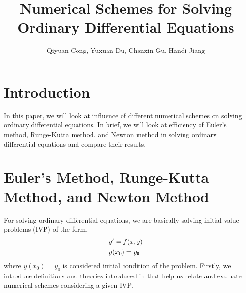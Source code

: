 \documentclass[
11pt, %
a4paper, %
oneside, %
headinclude,footinclude, %
BCOR5mm, %
]{scrartcl}
\title{Numerical Schemes for Solving Ordinary Differential Equations}
\author{Qiyuan Cong, Yuxuan Du, Chenxin Gu, Handi Jiang}
\date{} %
\begin{document}

\renewcommand{\sectionmark}[1]{\markright{\spacedlowsmallcaps{#1}}} %
\lehead{\mbox{\llap{\small\thepage\kern1em\color{halfgray} \vline}\color{halfgray}\hspace{0.5em}\rightmark\hfil}} %

\pagestyle{scrheadings} %


\maketitle %

\setcounter{tocdepth}{2} %

\section{Introduction}
In this paper, we will look at influence of different numerical schemes on solving ordinary differential equations. In brief, we will look at efficiency of Euler's method, Runge-Kutta method, and Newton method in solving ordinary differential equations and compare their results. 
\section{Euler's Method, Runge-Kutta Method, and Newton Method}
For solving ordinary differential equations, we are basically solving initial value problems (IVP) of the form, 
\begin{align}
    &y'=f(x,y)\notag \\
    &y(x_0)=y_0 \notag
\end{align}
where $y(x_0)=y_0$ is considered initial condition of the problem. Firstly, we introduce definitions and theories introduced in \cite{braun1983differential} that help us relate and evaluate numerical schemes considering a given IVP. 
\end{document}
